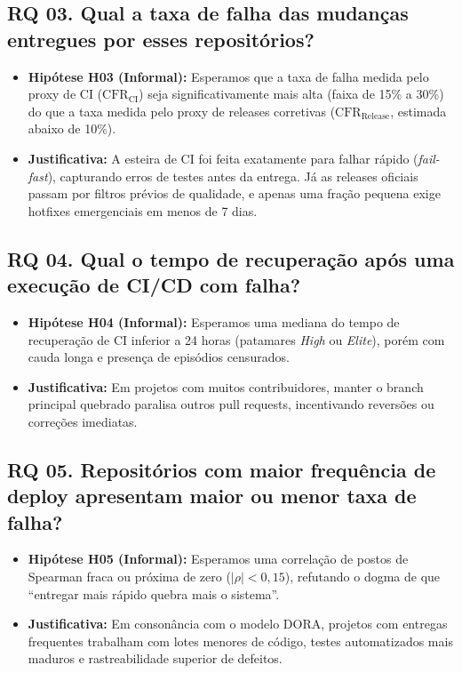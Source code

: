\documentclass[12pt]{article}
\begin{document}
\subsection{RQ 03. Qual a taxa de falha das mudanças entregues por esses repositórios?}
\begin{itemize}
    \item \textbf{Hipótese H03 (Informal):} Esperamos que a taxa de falha medida pelo proxy de CI ($\text{CFR}_{\text{CI}}$) seja significativamente mais alta (faixa de 15\% a 30\%) do que a taxa medida pelo proxy de releases corretivas ($\text{CFR}_{\text{Release}}$, estimada abaixo de 10\%).
    \item \textbf{Justificativa:} A esteira de CI foi feita exatamente para falhar rápido (\textit{fail-fast}), capturando erros de testes antes da entrega. Já as releases oficiais passam por filtros prévios de qualidade, e apenas uma fração pequena exige hotfixes emergenciais em menos de 7 dias.
\end{itemize}

\subsection{RQ 04. Qual o tempo de recuperação após uma execução de CI/CD com falha?}
\begin{itemize}
    \item \textbf{Hipótese H04 (Informal):} Esperamos uma mediana do tempo de recuperação de CI inferior a 24 horas (patamares \textit{High} ou \textit{Elite}), porém com cauda longa e presença de episódios censurados.
    \item \textbf{Justificativa:} Em projetos com muitos contribuidores, manter o branch principal quebrado paralisa outros pull requests, incentivando reversões ou correções imediatas.
\end{itemize}

\subsection{RQ 05. Repositórios com maior frequência de deploy apresentam maior ou menor taxa de falha?}
\begin{itemize}
    \item \textbf{Hipótese H05 (Informal):} Esperamos uma correlação de postos de Spearman fraca ou próxima de zero ($|\rho| < 0{,}15$), refutando o dogma de que ``entregar mais rápido quebra mais o sistema''.
    \item \textbf{Justificativa:} Em consonância com o modelo DORA, projetos com entregas frequentes trabalham com lotes menores de código, testes automatizados mais maduros e rastreabilidade superior de defeitos.
\end{itemize}
\end{document}

